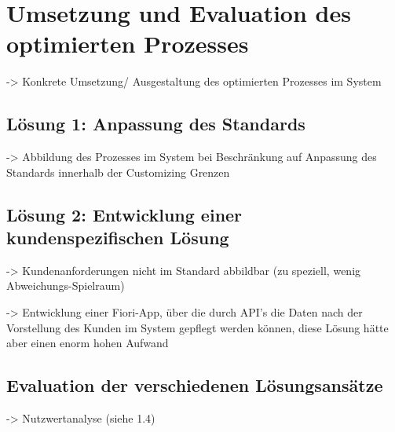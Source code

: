 \chapter{Umsetzung und Evaluation des optimierten Prozesses}

-> Konkrete Umsetzung/ Ausgestaltung des optimierten Prozesses im System 

\section{Lösung 1: Anpassung des Standards}

-> Abbildung des Prozesses im System bei Beschränkung auf Anpassung des Standards innerhalb der Customizing Grenzen

\section{Lösung 2: Entwicklung einer kundenspezifischen Lösung}

-> Kundenanforderungen nicht im Standard abbildbar (zu speziell, wenig Abweichungs-Spielraum)

-> Entwicklung einer Fiori-App, über die durch API's die Daten nach der Vorstellung des Kunden im System gepflegt werden können, diese Lösung hätte aber einen enorm hohen Aufwand

\section{Evaluation der verschiedenen Lösungsansätze}

-> Nutzwertanalyse (siehe 1.4)
